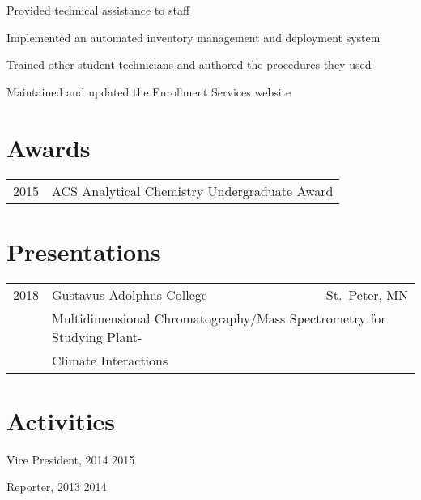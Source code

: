 \documentclass[]{deedy-resume-openfont}
\begin{document}
\newpage
\begin{minipage}[t]{0.7\textwidth}

\begin{tightemize}
\item Provided technical assistance to staff
\item Implemented an automated inventory management and deployment system
\item Trained other student technicians and authored the procedures they used
\item Maintained and updated the Enrollment Services website
\end{tightemize}

\section{Awards}
\begin{tabular}{rl}
2015	     & ACS Analytical Chemistry Undergraduate Award\\
\end{tabular}
\sectionsep

\section{Presentations}
\begin{tabular}{rlr}
2018    & Gustavus Adolphus College & St.\ Peter, MN \\
& \multicolumn{2}{l}{Multidimensional Chromatography/Mass Spectrometry for
    Studying Plant-}\\
& \multicolumn{2}{l}{Climate Interactions}\\
\end{tabular}
\sectionsep

\section{Activities}
\vspace{\topsep}
\begin{tightemize}
\item Vice President, 2014 \textendash{} 2015
\item Reporter, 2013 \textendash{} 2014
\end{tightemize}


\end{minipage}
\end{document}
